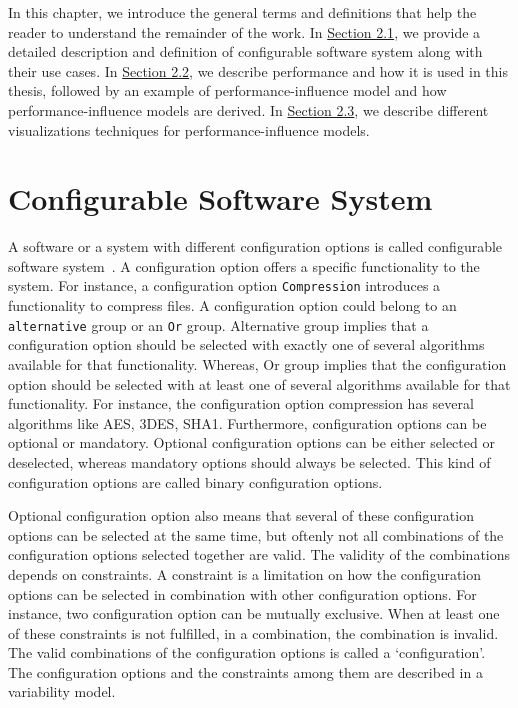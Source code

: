 \label{background}


In this chapter, we introduce the general terms and definitions that help the reader to understand the remainder of the work. In \hyperref[sec:2.1]{Section 2.1}, we provide a detailed description and definition of configurable software system along with their use cases. In \hyperref[sec:2.2]{Section 2.2}, we describe performance and how it is used in this thesis, followed by an example of performance-influence model and how performance-influence models are derived. In \hyperref[sec:2.3]{Section 2.3}, we describe different visualizations techniques for performance-influence models.


\section{Configurable Software System}
\label{sec:2.1}
A software or a system with different configuration options is called configurable software system~\cite{DBLP:books/daglib/0032924}. A configuration option offers a specific functionality to the system. For instance, a configuration option \texttt{Compression} introduces a functionality to compress files. A configuration option could belong to an \texttt{alternative} group or an \texttt{Or} group. Alternative group implies that a configuration option should be selected with exactly one of several algorithms available for that functionality. Whereas, Or group implies that the configuration option should be selected with at least one of several algorithms available for that functionality. For instance, the configuration option compression has several algorithms like AES, 3DES, SHA1. Furthermore, configuration options can be optional or mandatory. Optional configuration options can be either selected or deselected, whereas mandatory options should always be selected. This kind of configuration options are called binary configuration options. 

Optional configuration option also means that several of these configuration options can be selected at the same time, but oftenly not all combinations of the configuration options selected together are valid. The validity of the combinations depends on constraints. A constraint is a limitation on how the configuration options can be selected in combination with other configuration options. For instance, two configuration option can be mutually exclusive. When at least one of these constraints is not fulfilled, in a combination, the combination is invalid. The valid combinations of the configuration options is called a \enquote*{configuration}. The configuration options and the constraints among them are described in a variability model. 

